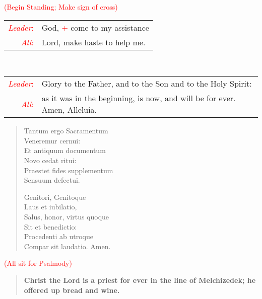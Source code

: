 \documentclass[letterpaper,14pt]{extarticle}
\newcommand{\side}[1]{\flagverse{\textcolor{red}{\textit{#1}}:}}
\newcommand{\sidestar}[1]{\textcolor{red}{\textit{#1}:}}
\newcommand{\rednote}[1]{\textcolor{red}{#1}}
\newlength{\oldindent}
\newcommand{\antiphon}[2]{
	\setlength{\oldindent}{\vindent}
	\setlength{\vindent}{0em}
	\begin{verse}
	\side{#1} \textbf{#2}
	\end{verse}
	\setlength{\vindent}{\oldindent}
}
\newcommand{\intercession}[2]{
	\begin{tabular}[h]{r p{4.25in}}
		\sidestar{Leader} & #1 \\
		\sidestar{All} & #2
	\end{tabular}}
\begin{document}
\vspace{-0.5\baselineskip}
\hspace{\leftmargini}\rednote{(Begin Standing; Make sign of cross)}\\
\intercession{God, \rednote{+} come to my assistance}
{Lord, make haste to help me.}\\
\intercession{Glory to the Father, and to the Son and to the Holy Spirit:}
{as it was in the beginning, is now, and will be for ever. Amen, Alleluia.}
\vspace{-1.0\baselineskip}

\vspace{-1.5\baselineskip}
\begin{verse}
	Tantum ergo Sacramentum \\
	Veneremur cernui: \\
	Et antiquum documentum \\
	Novo cedat ritui: \\
	Praestet fides supplementum \\
	Sensuum defectui. 

	 Genitori, Genitoque \\
	Laus et iubilatio, \\
	Salus, honor, virtus quoque \\
	Sit et benedictio: \\
	Procedenti ab utroque \\
	Compar sit laudatio.  Amen. 
\end{verse}
\vspace{-0.5\baselineskip}
\rednote{(All sit for Psalmody)}
\vspace{-1.875\baselineskip}
\vspace{-1.5\baselineskip}
\antiphon{Leader 1}{Christ the Lord is a priest for ever in the line of
Melchizedek; he offered up bread and wine.}  
\vspace{-1.0\baselineskip}
\end{document}
